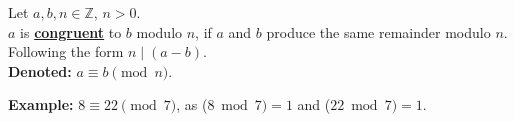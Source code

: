 \noindent
\begin{Def}[Congruence]

    \label{def:congruence}

    Let $a,b,n\in\mathbb{Z}$, $n>0$.\\

    \noindent
    $a$ is \underline{\textbf{congruent}} to $b$ modulo $n$, if $a$ and $b$ produce the same remainder
    modulo $n$. Following the form $n\mid (a-b)$.\\

    \noindent
    \textbf{Denoted:} $a\equiv b\pmod{n}$.
\end{Def}

\noindent
\textbf{Example:} $8\equiv22\pmod7$, as ($8\bmod7)=1$ and ($22\bmod7)=1$.\\


